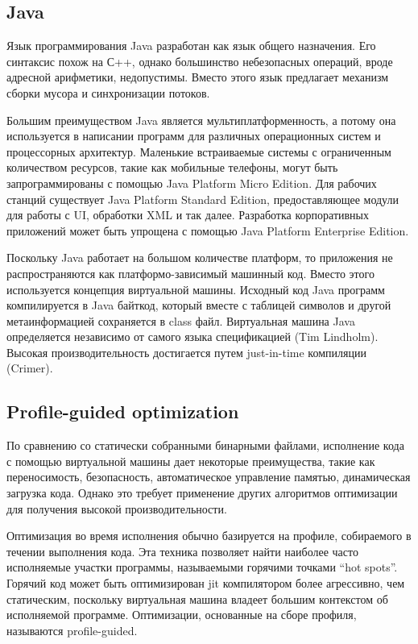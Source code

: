 \subsection{Java} \label{Java}
Язык программирования Java разработан как язык общего назначения. Его синтаксис похож на С++, однако большинство небезопасных операций, вроде адресной арифметики, недопустимы. Вместо этого язык предлагает механизм сборки мусора и синхронизации потоков.
\par
Большим преимуществом Java является мультиплатформенность, а потому она используется в написании программ для различных операционных систем и процессорных архитектур. 
Маленькие встраиваемые системы с ограниченным количеством ресурсов, такие как мобильные телефоны, могут быть запрограммированы с помощью Java Platform Micro Edition. Для рабочих станций существует Java Platform Standard Edition, предоставляющее модули для работы с UI, обработки XML и так далее. Разработка корпоративных приложений может быть упрощена с помощью Java Platform Enterprise Edition.
\par
Поскольку Java работает на большом количестве платформ, то приложения не распространяются как платформо-зависимый машинный код. Вместо этого используется концепция виртуальной машины. Исходный код Java программ компилируется в Java байткод, который вместе с таблицей символов и другой метаинформацией сохраняется в class файл.  Виртуальная машина Java определяется независимо от самого языка спецификацией (Tim Lindholm). Высокая производительность достигается путем just-in-time компиляции (Crimer). 

\subsection{Profile-guided optimization}
По сравнению со статически собранными бинарными файлами, исполнение кода с помощью виртуальной машины дает некоторые преимущества, такие как переносимость, безопасность, автоматическое управление памятью, динамическая загрузка кода. Однако это требует применение других алгоритмов оптимизации для получения высокой производительности.
\par
Оптимизация во время исполнения обычно базируется на профиле, собираемого в течении выполнения кода. 
Эта техника позволяет найти наиболее часто исполняемые участки программы, называемыми горячими точками “hot spots”. Горячий код может быть оптимизирован jit компилятором более агрессивно, чем статическим, поскольку виртуальная машина владеет большим контекстом об исполняемой программе. Оптимизации, основанные на сборе профиля, называются profile-guided.

